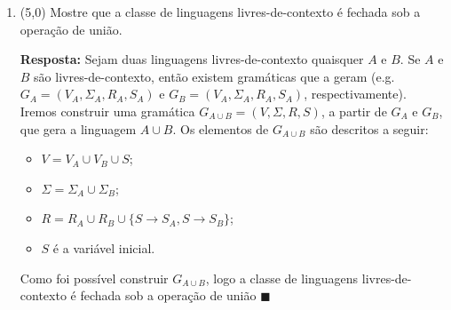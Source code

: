 \documentclass[12pt,a4paper,oneside]{article}
\begin{document}
\begin{enumerate}
\begin{enumerate}
		{\color{blue} {\bf Resposta:} Esta linguagem pode ser composta pela união de três outras linguagens: 
			\begin{enumerate}
				\item todas as cadeias que têm mais 0s do que 1s \\(representada pela variável $S$);
				\item todas as cadeias que têm mais 1s do que 0s \\(representada pela variável $U$); e
				\item todas as cadeias que contêm 10 como subcadeia \\(representada pela variável $X$).
			\end{enumerate}
			Assim, a gramática construída, dada abaixo, é a união das três linguagens dadas acima.
			
			\begin{itemize}
				\item[] $R \rightarrow S$ | $U$ | $X$
				\item[] $S \rightarrow T0T$
				\item[] $T \rightarrow  TT$ | $0T1$ | $1T0$ | $0$ | $\epsilon$
				\item[] $U \rightarrow V1V$
				\item[] $V \rightarrow  VV$ | $0V1$ | $1V0$ | $1$ | $\epsilon$
				\item[] $X \rightarrow Z10Z$
				\item[] $Z \rightarrow 0Z$ | $1Z$ | $\epsilon$
			\end{itemize}
		}
	\end{enumerate}

	\newpage

	\item (5,0) Mostre que a classe de linguagens livres-de-contexto é fechada sob a operação de união.
	
		\vspace*{0.3cm}
	
	{\color{blue} {\bf Resposta:} Sejam duas linguagens livres-de-contexto quaisquer $A$ e $B$. Se $A$ e $B$ são livres-de-contexto, então existem gramáticas que a geram (e.g. $G_A = (V_A, \Sigma_A, R_A, S_A)$ e $G_B = (V_A, \Sigma_A, R_A, S_A)$, respectivamente). Iremos construir uma gramática $G_{A \cup B} = (V, \Sigma, R, S)$, a partir de $G_A$ e $G_B$, que gera a linguagem $A \cup B$. Os elementos de $G_{A \cup B}$ são descritos a seguir:
		\begin{itemize}
			\item $V = V_A \cup V_B \cup S$;
			\item $\Sigma = \Sigma_A \cup \Sigma_B$;
			\item $R = R_A \cup R_B \cup \{S \rightarrow S_A , S \rightarrow S_B\}$;
			\item $S$ é a variável inicial.
		\end{itemize}
		Como foi possível construir $G_{A \cup B}$, logo a classe de linguagens livres-de-contexto é fechada sob a operação de união $\blacksquare$
	}


\end{enumerate}
\end{document}
